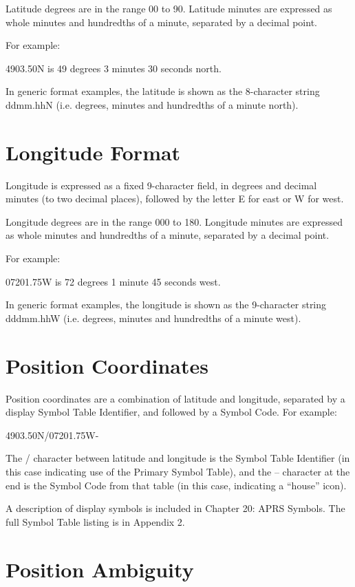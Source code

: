 Latitude degrees are in the range 00 to 90. Latitude minutes are expressed as
whole minutes and hundredths of a minute, separated by a decimal point.

For example:

4903.50N is 49 degrees 3 minutes 30 seconds north.

In generic format examples, the latitude is shown as the 8-character string
ddmm.hhN (i.e. degrees, minutes and hundredths of a minute north).

\section{Longitude Format}

Longitude is expressed as a fixed 9-character field, in degrees and decimal
minutes (to two decimal places), followed by the letter E for east or W for
west.


Longitude degrees are in the range 000 to 180. Longitude minutes are
expressed as whole minutes and hundredths of a minute, separated by a
decimal point.

For example:

07201.75W is 72 degrees 1 minute 45 seconds west.

In generic format examples, the longitude is shown as the 9-character string
dddmm.hhW (i.e. degrees, minutes and hundredths of a minute west).

\section{Position Coordinates}

Position coordinates are a combination of latitude and longitude, separated
by a display Symbol Table Identifier, and followed by a Symbol Code. For
example:

4903.50N/07201.75W-

The / character between latitude and longitude is the Symbol Table
Identifier (in this case indicating use of the Primary Symbol Table), and the –
character at the end is the Symbol Code from that table (in this case,
indicating a “house” icon).

A description of display symbols is included in Chapter 20: APRS Symbols.
The full Symbol Table listing is in Appendix 2.

\section{Position Ambiguity}


